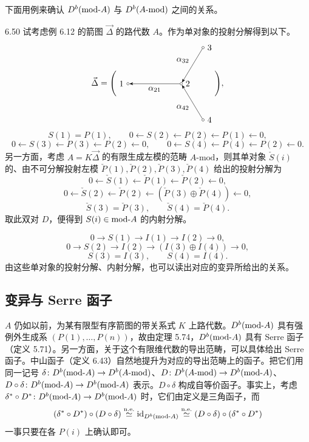下面用例来确认 $D^{b}(\mathrm{mod}\text{-}A)$ 与 $D^{b}(A\text{-}\mathrm{mod})$ 之间的关系。

\begin{example}{6.50}
试考虑例 6.12 的箭图 $\vec{\Delta}$ 的路代数 $A$。作为单对象的投射分解得到以下。
\[
\vec{\Delta}=
\Biggl(
\begin{tikzpicture}[baseline=-0.5ex]
  \node[draw,circle,inner sep=1pt,label=left:{$1$}] (v1) at (0,0) {};
  \node[draw,circle,inner sep=1pt,label=right:{$2$}] (v2) at (2.2,0) {};
  \node[draw,circle,inner sep=1pt,label=right:{$3$}] (v3) at (3.1,1.5) {};
  \node[draw,circle,inner sep=1pt,label=right:{$4$}] (v4) at (3.1,-1.5) {};
  \draw[-{Stealth}] (v2) -- node[below]{$\alpha_{21}$} (v1);
  \draw[-{Stealth}] (v3) -- node[above left]{$\alpha_{32}$} (v2);
  \draw[-{Stealth}] (v4) -- node[below left]{$\alpha_{42}$} (v2);
\end{tikzpicture}
\Biggr),
\]
\[
S(1)=P(1),\qquad
0\leftarrow S(2)\leftarrow P(2)\leftarrow P(1)\leftarrow 0,
\]
\[
0\leftarrow S(3)\leftarrow P(3)\leftarrow P(2)\leftarrow 0,\qquad
0\leftarrow S(4)\leftarrow P(4)\leftarrow P(2)\leftarrow 0.
\]
另一方面，考虑 $A=K\vec{\Delta}$ 的有限生成左模的范畴 $A\text{-}\mathrm{mod}$，则其单对象 $\check S(i)$ 的、由不可分解投射左模 $\check P(1),\check P(2),\check P(3),\check P(4)$ 给出的投射分解为
\[
0\leftarrow\check S(1)\leftarrow\check P(1)\leftarrow\check P(2)\leftarrow 0,
\]
\[
0\leftarrow\check S(2)\leftarrow\check P(2)\leftarrow(\check P(3)\oplus\check P(4))\leftarrow 0,
\]
\[
\check S(3)=\check P(3),\qquad \check S(4)=\check P(4).
\]
取此双对 $D$，便得到 $S(i)\in\mathrm{mod}\text{-}A$ 的内射分解。

\[
0\to S(1)\to I(1)\to I(2)\to 0,
\]
\[
0\to S(2)\to I(2)\to(I(3)\oplus I(4))\to 0,
\]
\[
S(3)=I(3),\qquad S(4)=I(4).
\]
由这些单对象的投射分解、内射分解，也可以读出对应的变异所给出的关系。
\end{example}

\subsection{变异与 Serre 函子}

$A$ 仍如以前，为某有限型有序箭图的带关系式 $K$ 上路代数。$D^{b}(\mathrm{mod}\text{-}A)$ 具有强例外生成系 $(P(1),\dots,P(n))$，故由定理 5.74，$D^{b}(\mathrm{mod}\text{-}A)$ 具有 Serre 函子（定义 5.71）。另一方面，关于这个有限维代数的导出范畴，可以具体给出 Serre 函子。中山函子（定义 6.43）自然地提升为对应的导出范畴上的函子。把它们用同一记号 $\delta\colon D^{b}(\mathrm{mod}\text{-}A)\to D^{b}(A\text{-}\mathrm{mod})$、$D\colon D^{b}(A\text{-}\mathrm{mod})\to D^{b}(\mathrm{mod}\text{-}A)$、$D\circ\delta\colon D^{b}(\mathrm{mod}\text{-}A)\to D^{b}(\mathrm{mod}\text{-}A)$ 表示。$D\circ\delta$ 构成自等价函子。事实上，考虑 $\delta^{*}\circ D^{*}\colon D^{b}(\mathrm{mod}\text{-}A)\to D^{b}(\mathrm{mod}\text{-}A)$ 时，它们由定义是三角函子，而
\[
(\delta^{*}\circ D^{*})\circ(D\circ\delta)\overset{\mathrm{n.e.}}{\simeq}\mathrm{id}_{D^{b}(\mathrm{mod}\text{-}A)}\overset{\mathrm{n.e.}}{\simeq}(D\circ\delta)\circ(\delta^{*}\circ D^{*})
\]
一事只要在各 $P(i)$ 上确认即可。

